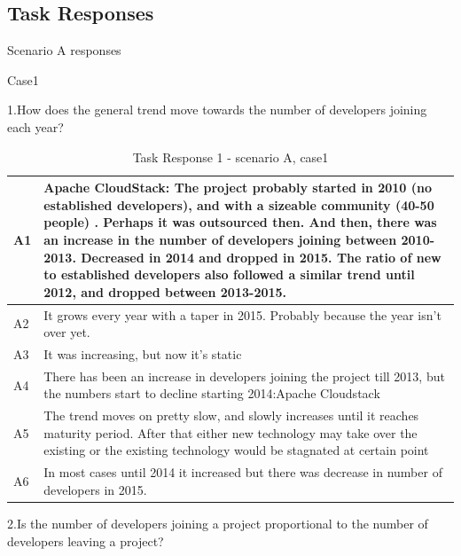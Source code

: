\documentclass[double,12pt]{beavtex}
\begin{document}
\begin{appendices}
\chapter{Task Responses}

Scenario A responses

Case1

1.How does the general trend move towards the number of developers joining each year?

\begin{table}[H]
\begin{tabular}{ |p{2cm}|p{12cm}| }
 \hline
 A1 & Apache CloudStack: The project probably started in 2010 (no established developers), and with a sizeable community (40-50 people) . Perhaps it was outsourced then. And then, there was an increase in the number of developers joining between 2010-2013. Decreased in 2014 and dropped in 2015. The ratio of new to established developers also followed a similar trend until 2012, and dropped between 2013-2015.\\
 \hline
 A2 & It grows every year with a taper in 2015. Probably because the year isn't over yet.\\ \hline
 A3 & It was increasing, but now it's static\\ \hline
 A4 & There has been an increase in developers joining the project till 2013, but the numbers start to decline starting 2014:Apache Cloudstack\\ \hline
 A5 & The trend moves on pretty slow, and slowly increases until it reaches maturity period. After that either new technology may take over the existing or the existing technology would be stagnated at certain point\\ \hline
 A6 & In most cases until 2014 it increased but there was decrease in number of developers in 2015.\\
 \hline
\end{tabular}
\caption{Task Response 1 - scenario A, case1}
\label{tab:table1}
\end{table}

2.Is the number of developers joining a project proportional to the number of developers leaving a project?


\end{appendices}
\end{document}
